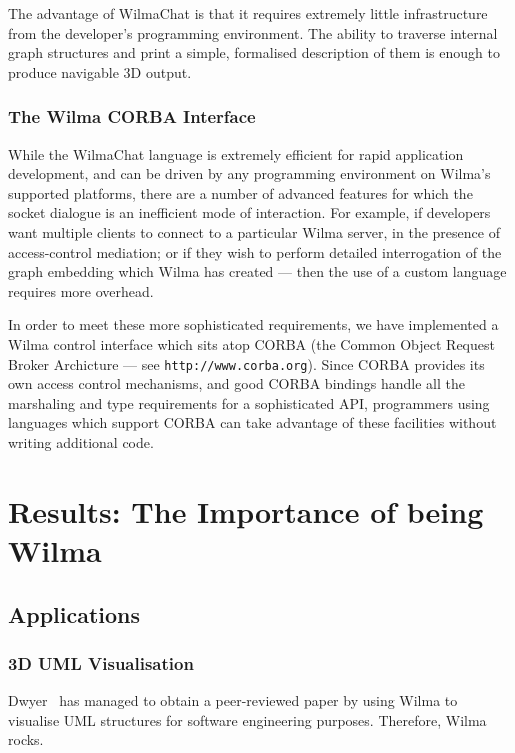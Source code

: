 \documentclass[runningheads]{cl2emult}
\newcommand{\url}[1]{{\small{\tt #1}}}
\begin{document}
The advantage of WilmaChat is that it requires extremely little infrastructure
from the developer's programming environment.  The ability to traverse
internal graph structures and print a simple, formalised description of them
is enough to produce navigable 3D output.

\subsubsection{The Wilma CORBA Interface}

While the WilmaChat language is extremely efficient for rapid application
development, and can be driven by any programming environment on Wilma's
supported platforms, there are a number of advanced features for which the
socket dialogue is an inefficient mode of interaction.  For example, if
developers want multiple clients to connect to a particular Wilma server, in
the presence of access-control mediation; or if they wish to perform detailed
interrogation of the graph embedding which Wilma has created --- then the use
of a custom language requires more overhead.

In order to meet these more sophisticated requirements, we have implemented a
Wilma control interface which sits atop CORBA (the Common Object Request
Broker Archicture --- see \url{http://www.corba.org}).  Since CORBA provides
its own access control mechanisms, and good CORBA bindings handle all the
marshaling and type requirements for a sophisticated API, programmers using
languages which support CORBA can take advantage of these facilities without
writing additional code.

\section{Results: The Importance of being Wilma}
\label{sec:results}

\subsection{Applications}
\subsubsection{3D UML Visualisation} \label{sec:3duml}

Dwyer~\cite{dwyer013D-UML} has managed to obtain a peer-reviewed paper by
using Wilma to visualise UML structures for software engineering purposes.
Therefore, Wilma rocks.
\end{document}
